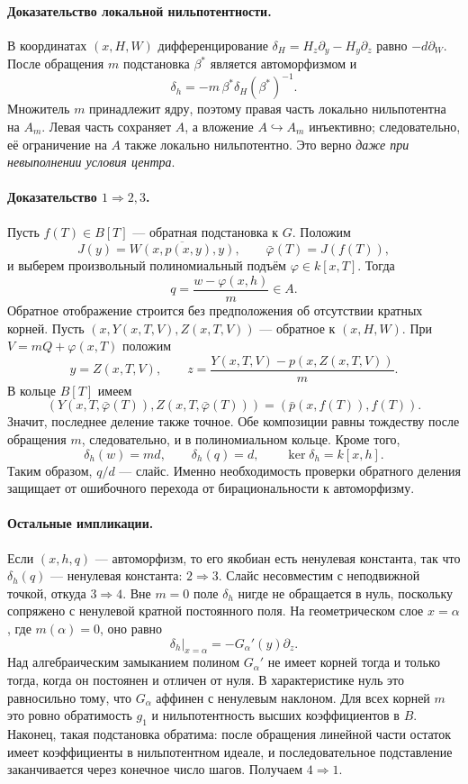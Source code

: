 \paragraph{Доказательство локальной нильпотентности.}
В координатах $(x,H,W)$ дифференцирование
$\delta_H=H_z\partial_y-H_y\partial_z$ равно $-d\partial_W$.
После обращения $m$ подстановка $\beta^*$ является автоморфизмом и
\[
 \delta_h=-m\,\beta^*\delta_H(\beta^*)^{-1}.
\]
Множитель $m$ принадлежит ядру, поэтому правая часть локально
нильпотентна на $A_m$. Левая часть сохраняет $A$, а вложение $A\hookrightarrow
A_m$ инъективно; следовательно, её ограничение на $A$ также локально
нильпотентно. Это верно \emph{даже при невыполнении условия центра}.

\paragraph{Доказательство $1\Rightarrow2,3$.}
Пусть $f(T)\in B[T]$ --- обратная подстановка к $G$. Положим
\[
 J(y)=\overline{W(x,p(x,y),y)},\qquad \bar\varphi(T)=J(f(T)),
\]
и выберем произвольный полиномиальный подъём $\varphi\in k[x,T]$.
Тогда
\[
 q=\frac{w-\varphi(x,h)}{m}\in A.
\]
Обратное отображение строится без предположения об отсутствии кратных
корней. Пусть $(x,Y(x,T,V),Z(x,T,V))$ --- обратное к $(x,H,W)$.
При $V=mQ+\varphi(x,T)$ положим
\[
 y=Z(x,T,V),\qquad z=\frac{Y(x,T,V)-p(x,Z(x,T,V))}{m}.
\]
В кольце $B[T]$ имеем
\[
 (Y(x,T,\bar\varphi(T)),Z(x,T,\bar\varphi(T)))
   =(\bar p(x,f(T)),f(T)).
\]
Значит, последнее деление также точное. Обе композиции равны тождеству
после обращения $m$, следовательно, и в полиномиальном кольце. Кроме того,
\[
 \delta_h(w)=md,\qquad \delta_h(q)=d,
 \qquad \ker\delta_h=k[x,h].
\]
Таким образом, $q/d$ --- слайс. Именно необходимость проверки обратного
деления защищает от ошибочного перехода от бирациональности к автоморфизму.

\paragraph{Остальные импликации.}
Если $(x,h,q)$ --- автоморфизм, то его якобиан есть ненулевая константа,
так что $\delta_h(q)$ --- ненулевая константа: $2\Rightarrow3$.
Слайс несовместим с неподвижной точкой, откуда $3\Rightarrow4$.
Вне $m=0$ поле $\delta_h$ нигде не обращается в нуль, поскольку сопряжено
с ненулевой кратной постоянного поля. На геометрическом слое $x=\alpha$,
где $m(\alpha)=0$, оно равно
\[
 \delta_h\big|_{x=\alpha}=-G_\alpha'(y)\partial_z.
\]
Над алгебраическим замыканием полином $G_\alpha'$ не имеет корней тогда
и только тогда, когда он постоянен и отличен от нуля. В характеристике
нуль это равносильно тому, что $G_\alpha$ аффинен с ненулевым наклоном.
Для всех корней $m$ это ровно обратимость $g_1$ и нильпотентность высших
коэффициентов в $B$. Наконец, такая подстановка обратима: после обращения
линейной части остаток имеет коэффициенты в нильпотентном идеале, и
последовательное подставление заканчивается через конечное число шагов.
Получаем $4\Rightarrow1$.

